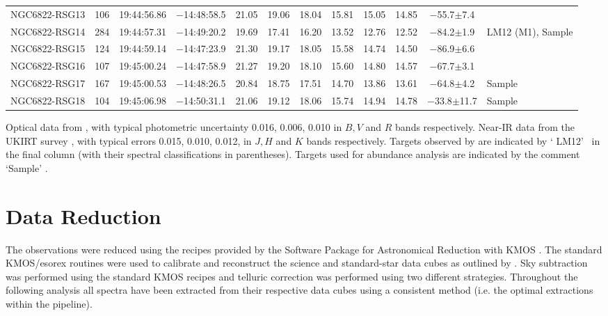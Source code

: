 \begin{table}
\begin{threeparttable}
\begin{tabular}{lrcccccccccl}
NGC6822-RSG13 & 106 &   19:44:56.86  &  $-$14:48:58.5  &  21.05  &  19.06  &  18.04  &  15.81  &  15.05  &  14.85  &  $-$55.7$\pm$7.4 \\
NGC6822-RSG14 & 284 &   19:44:57.31  &  $-$14:49:20.2  &  19.69  &  17.41  &  16.20  &  13.52  &  12.76  &  12.52  &  $-$84.2$\pm$1.9 & LM12 (M1), Sample \\
NGC6822-RSG15 & 124 &   19:44:59.14  &  $-$14:47:23.9  &  21.30  &  19.17  &  18.05  &  15.58  &  14.74  &  14.50  &  $-$86.9$\pm$6.6 \\
NGC6822-RSG16 & 107 &   19:45:00.24  &  $-$14:47:58.9  &  21.27  &  19.20  &  18.10  &  15.60  &  14.80  &  14.57  &  $-$67.7$\pm$3.1 \\
NGC6822-RSG17 & 167 &   19:45:00.53  &  $-$14:48:26.5  &  20.84  &  18.75  &  17.51  &  14.70  &  13.86  &  13.61  &  $-$64.8$\pm$4.2 & Sample\\
NGC6822-RSG18 & 104 &   19:45:06.98  &  $-$14:50:31.1  &  21.06  &  19.12  &  18.06  &  15.74  &  14.94  &  14.78  &\a$-$33.8$\pm$11.7& Sample\\
\hline
\end{tabular}

\begin{tablenotes}
  \item Optical data from
  \protect\cite{2007AJ....134.2474M}, with typical photometric uncertainty 0.016, 0.006, 0.010 in $B, V$ and $R$ bands respectively.
  Near-IR data from the UKIRT survey
  \protect\cite[see][for details]{2012A&A...540A.135S}, with typical errors 0.015, 0.010, 0.012, in $J, H$ and $K$ bands respectively.
  Targets observed by
  \protect\cite{2012AJ....144....2L}
  are indicated by \textquoteleft
  LM12\textquoteright~ in the final column (with their spectral classifications in parentheses).
  Targets used for abundance analysis are indicated by the comment
  \textquoteleft Sample\textquoteright
  .
\end{tablenotes}
\end{threeparttable}
\end{table}



\section{Data Reduction} %
\label{sec:ngc6822data_red}

The observations were reduced using the recipes provided by the Software Package for Astronomical Reduction with KMOS
\citep[SPARK;][]{2013A&A...558A..56D}.
The standard KMOS/esorex routines were used to calibrate and reconstruct the science and standard-star data cubes as outlined by
\cite{2013A&A...558A..56D}.
Sky subtraction was performed using the standard KMOS recipes and telluric correction was performed using two different strategies.
Throughout the following analysis all spectra have been extracted from their respective data cubes using a consistent method (i.e. the optimal extractions within the pipeline).

